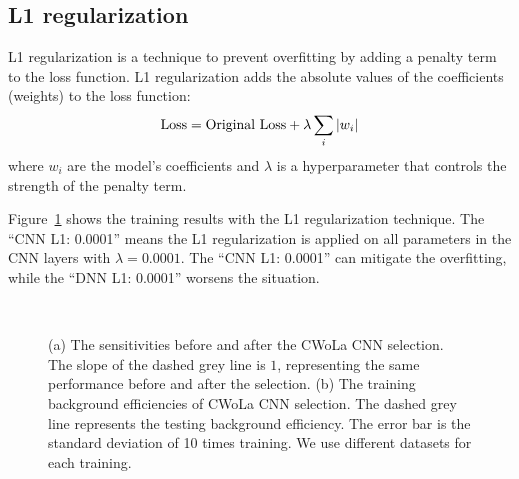\documentclass[12pt]{article}
\begin{document}
    \subsection{L1 regularization}%
    \label{sub:l1_regularization}
        L1 regularization is a technique to prevent overfitting by adding a penalty term to the loss function. L1 regularization adds the absolute values of the coefficients (weights) to the loss function:
        \begin{equation}
            \text{Loss} = \text{Original Loss} + \lambda \sum_{i} \abs{w_i}
        \end{equation}
        where $w_i$ are the model's coefficients and $\lambda$ is a hyperparameter that controls the strength of the penalty term.

        Figure~\ref{fig:sensitivity_improvement_background_pass_rate_l1} shows the training results with the L1 regularization technique. The ``CNN L1: 0.0001'' means the L1 regularization is applied on all parameters in the CNN layers with $\lambda = 0.0001$. The ``CNN L1: 0.0001'' can mitigate the overfitting, while the ``DNN L1: 0.0001'' worsens the situation.
        \begin{figure}[htpb]
            \centering
             \\
            \caption{(a) The sensitivities before and after the CWoLa CNN selection. The slope of the dashed grey line is $1$, representing the same performance before and after the selection. (b) The training background efficiencies of CWoLa CNN selection. The dashed grey line represents the testing background efficiency. The error bar is the standard deviation of 10 times training. We use different datasets for each training.}
            \label{fig:sensitivity_improvement_background_pass_rate_l1}
        \end{figure}
\end{document}
